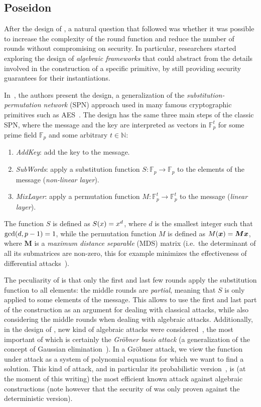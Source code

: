\subsection{Poseidon}
After the design of \Mimc{}, a natural question that followed was whether it was possible to increase
the complexity of the round function and reduce the number of rounds without compromising on 
security.
In particular, researchers started exploring the design of \emph{algebraic frameworks} that could 
abstract from the details involved in the construction of a specific primitive, by still providing 
security guarantees for their instantiations.

In~\cite{GrassiLRRS2019}, the authors present the \Hades{} design, a generalization
of the \emph{substitution-permutation network} (SPN) approach used in many famous cryptographic 
primitives such as AES~\cite{DaemenR1999}.
The \Hades{} design has the same three main steps of the classic SPN, where the 
message and the key are interpreted as vectors in \(\mathbb{F}_{p}^t\) for some prime field 
\(\mathbb{F}_p\) and some arbitrary \(t \in \mathbb{N}\):
\begin{enumerate}
  \item \emph{AddKey}: add the key to the message.
  \item \emph{SubWords}: apply a substitution function \(S\colon \mathbb{F}_{p} \to \mathbb{F}_{p}\) 
        to the elements of the message (\emph{non-linear layer}).
  \item \emph{MixLayer}: apply a permutation function \(M\colon \mathbb{F}_{p}^t \to \mathbb{F}_{p}^t\) 
        to the message (\emph{linear layer}).
\end{enumerate}
The function \(S\) is defined as \(\call{S}{x} = x^d\), where \(d\) is the smallest 
integer such that \(\call{\gcd}{d, p -1} = 1\), while the permutation function \(M\) is defined as 
\(\call{M}{\bm{x}} = \bm{Mx}\), where \(\bm{M}\) is a \emph{maximum distance separable} (MDS) 
matrix (i.e.\ the determinant of all its submatrices are non-zero, this for example minimizes the 
effectiveness of differential attacks~\cite{MacwilliamsS1977,RijmenD1996}).

The peculiarity of \Hades{} is that only the first and last few rounds apply the substitution
function to all elements: the middle rounds are \emph{partial}, meaning that \(S\) is only applied 
to some elements of the message.
This allows to use the first and last part of the construction as an argument for dealing with 
classical attacks, while also considering the middle rounds when dealing with algebraic attacks.
Additionally, in the design of \Hades{}, new kind of algebraic attacks were 
considered~\cite{BeyneEtAl2020}, the most important of which is certainly the 
\emph{Gr\"{o}bner basis attack} 
(a generalization of the concept of Gaussian elimination~\cite{CoxLO2015,Lazard1983}).
In a Gr\"{o}bner attack, we view the function under attack as a system of polynomial equations 
for which we want to find a solution.
This kind of attack, and in particular its probabilistic version~\cite{FaugereGHR2014}, is 
(at the moment of this writing) the most efficient known attack against algebraic constructions 
(note however that the security of \Hades{} was only proven against the deterministic 
version).

